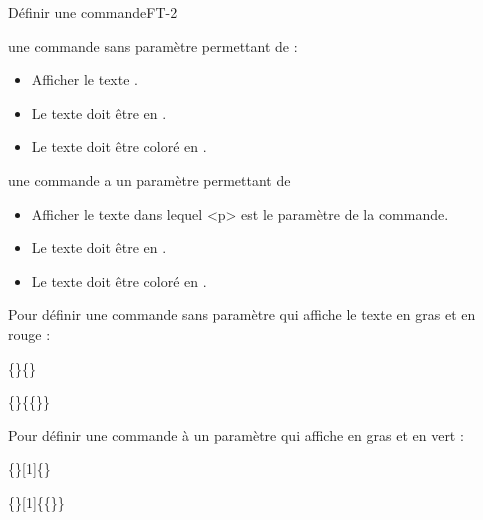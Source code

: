 \begin{EXO}{Définir une commande}{FT-2}
    \begin{tcbenumerate}[2]
        \tcbitem {}  une commande sans paramètre permettant de : 
        \begin{itemize}[label=$\bullet$]
            \item Afficher le texte .
            \item Le texte doit être en . 
            \item Le texte doit être coloré en .
        \end{itemize}
        \tcbitem {}  une commande a un paramètre permettant de 
        \begin{itemize}[label=$\bullet$]
            \item Afficher le texte  dans lequel <p> est le paramètre de la commande.
            \item Le texte doit être en . 
            \item Le texte doit être coloré en .
        \end{itemize}
    \end{tcbenumerate}

    \exocorrection

    \begin{tcbenumerate}
        \tcbitem Pour définir une commande sans paramètre qui affiche le texte  en gras et en rouge :
        
        \{\}\{\}
        
        
        
        \{\}\{\{\}\}
        
        \tcbitem Pour définir une commande à un paramètre qui affiche  en gras et en vert :
        
        \{\}[1]\{\}
        
        
        
        \{\}[1]\{\{\}\}
    \end{tcbenumerate}
\end{EXO}